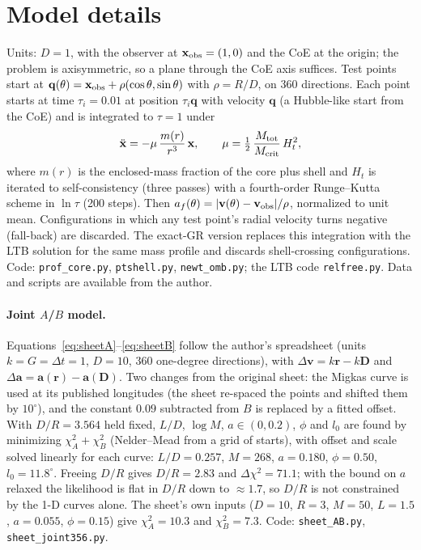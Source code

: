 \documentclass[11pt,a4paper]{article}
\newcommand{\dg}{^\circ}
\begin{document}
\section{Model details}\label{app:model}
Units: $D=1$, with the observer at $\mathbf x_{\rm obs}=(1,0)$ and the CoE at the origin; the problem is axisymmetric, so a plane through the CoE axis suffices. Test points start at $\mathbf q(\theta)=\mathbf x_{\rm obs}+\rho(\cos\theta,\sin\theta)$ with $\rho=R/D$, on 360 directions. Each point starts at time $\tau_i=0.01$ at position $\tau_i\mathbf q$ with velocity $\mathbf q$ (a Hubble-like start from the CoE) and is integrated to $\tau=1$ under
\begin{equation}
\ddot{\mathbf x}=-\mu\,\frac{m(r)}{r^3}\,\mathbf x,\qquad \mu=\tfrac12\,\frac{M_{\rm tot}}{M_{\rm crit}}\,H_t^2,
\end{equation}
where $m(r)$ is the enclosed-mass fraction of the core plus shell and $H_t$ is iterated to self-consistency (three passes) with a fourth-order Runge--Kutta scheme in $\ln\tau$ (200 steps). Then $a_f(\theta)=\lvert\mathbf v(\theta)-\mathbf v_{\rm obs}\rvert/\rho$, normalized to unit mean. Configurations in which any test point's radial velocity turns negative (fall-back) are discarded. The exact-GR version replaces this integration with the LTB solution for the same mass profile and discards shell-crossing configurations. Code: \texttt{prof\_core.py}, \texttt{ptshell.py}, \texttt{newt\_omb.py}; the LTB code \texttt{relfree.py}. Data and scripts are available from the author.

\paragraph{Joint $A$/$B$ model.} Equations~\ref{eq:sheetA}--\ref{eq:sheetB} follow the author's spreadsheet (units $k=G=\Delta t=1$, $D=10$, 360 one-degree directions), with $\Delta\mathbf v=k\mathbf r-k\mathbf D$ and $\Delta\mathbf a=\mathbf a(\mathbf r)-\mathbf a(\mathbf D)$. Two changes from the original sheet: the Migkas curve is used at its published longitudes (the sheet re-spaced the points and shifted them by $10\dg$), and the constant $0.09$ subtracted from $B$ is replaced by a fitted offset. With $D/R=3.564$ held fixed, $L/D$, $\log M$, $a\in(0,0.2)$, $\phi$ and $l_0$ are found by minimizing $\chi^2_A+\chi^2_B$ (Nelder--Mead from a grid of starts), with offset and scale solved linearly for each curve: $L/D=0.257$, $M=268$, $a=0.180$, $\phi=0.50$, $l_0=11.8\dg$. Freeing $D/R$ gives $D/R=2.83$ and $\Delta\chi^2=71.1$; with the bound on $a$ relaxed the likelihood is flat in $D/R$ down to $\approx1.7$, so $D/R$ is not constrained by the 1-D curves alone. The sheet's own inputs ($D=10$, $R=3$, $M=50$, $L=1.5$, $a=0.055$, $\phi=0.15$) give $\chi^2_A=10.3$ and $\chi^2_B=7.3$. Code: \texttt{sheet\_AB.py}, \texttt{sheet\_joint356.py}.
\end{document}
